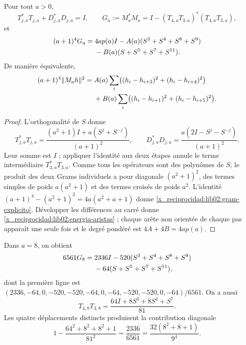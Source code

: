 \begin{proposition}
\label{x_reciprocidad:lib02:gram}
Pour tout \(a>0\),
\[
 T_{j,a}^*T_{j,a}+D_{j,a}^*D_{j,a}=I,\qquad
 G_a:=M_a^*M_a=I-(T_{4,a}T_{3,a})^*(T_{4,a}T_{3,a}),
\]
et
\begin{align}
 (a+1)^4G_a={}&4ap(a)I
 -A(a)(S^3+S^4+S^8+S^9)\notag\\
 &-B(a)(S+S^5+S^7+S^{11}).
 \label{x_reciprocidad:lib02:gram-explicito}
\end{align}
De manière équivalente,
\begin{align}
 (a+1)^4\|M_ah\|^2={}&A(a)\sum_i
 \bigl((h_i-h_{i+3})^2+(h_i-h_{i+4})^2\bigr)\notag\\
 &+B(a)\sum_i
 \bigl((h_i-h_{i+1})^2+(h_i-h_{i+5})^2\bigr).
 \label{x_reciprocidad:lib02:energia-aristas}
\end{align}
\end{proposition}
\begin{proof}
L'orthogonalité de \(S\) donne
\[
 T_{j,a}^*T_{j,a}
 =\frac{(a^2+1)I+a(S^j+S^{-j})}{(a+1)^2},\qquad
 D_{j,a}^*D_{j,a}
 =\frac{a(2I-S^j-S^{-j})}{(a+1)^2}.
\]
Leur somme est \(I\) ; appliquer l’identité aux deux étapes annule le
terme intermédiaire \(T_{3,a}^*T_{3,a}\). Comme tous les opérateurs
sont des polynômes de \(S\), le produit des deux Grams individuels
a pour diagonale \((a^2+1)^2\), des termes simples de poids
\(a(a^2+1)\) et des termes croisés de poids \(a^2\). L’identité
\((a+1)^4-(a^2+1)^2=4a(a^2+a+1)\) donne
\eqref{x_reciprocidad:lib02:gram-explicito}. Développer les différences au carré donne
\eqref{x_reciprocidad:lib02:energia-aristas} ; chaque arête non orientée de chaque pas
apparaît une seule fois et le degré pondéré est \(4A+4B=4ap(a)\).
\end{proof}

Dans \(a=8\), on obtient
\begin{align}
 6561G_8={}&2336I-520(S^3+S^4+S^8+S^9)\notag\\
 &-64(S+S^5+S^7+S^{11}),
 \label{x_reciprocidad:lib02:gram-nonadico}
\end{align}
dont la première ligne est
\((2336,-64,0,-520,-520,-64,0,-64,-520,-520,0,-64)/6561\).
On a aussi
\[
 T_{4,8}T_{3,8}=\frac{64I+8S^3+8S^4+S^7}{81}.
\]
Les quatre déplacements distincts produisent la contribution diagonale
\[
 1-\frac{64^2+8^2+8^2+1}{81^2}
 =\frac{2336}{6561}
 =\frac{32(8^2+8+1)}{9^4}.
\]

